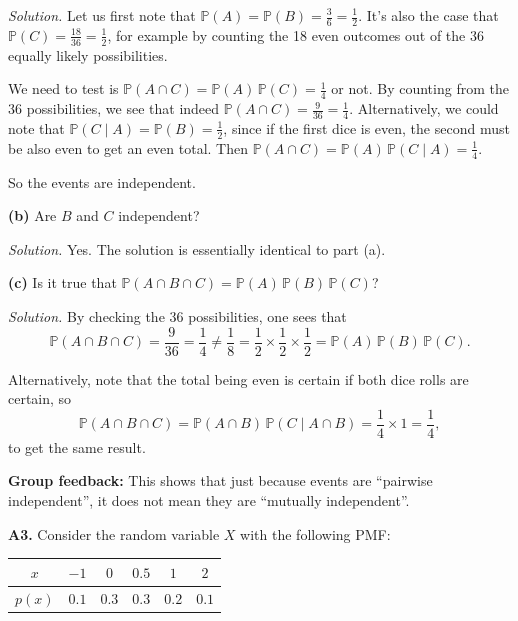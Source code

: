 \documentclass[
  a4paper,
]{book}
\theoremstyle{definition}
\theoremstyle{definition}
\theoremstyle{definition}
\theoremstyle{definition}
\theoremstyle{remark}
\begin{document}
\begin{myanswers}
\emph{Solution.} Let us first note that \(\mathbb P(A) = \mathbb P(B) = \frac36 = \frac12\). It's also the case that \(\mathbb P(C) = \frac{18}{36} = \frac12\), for example by counting the 18 even outcomes out of the 36 equally likely possibilities.

We need to test is \(\mathbb P(A \cap C) = \mathbb P(A) \, \mathbb P(C) = \frac14\) or not. By counting from the 36 possibilities, we see that indeed \(\mathbb P(A \cap C) = \frac{9}{36} = \frac{1}{4}\). Alternatively, we could note that \(\mathbb P(C \mid A) = \mathbb P(B) = \frac12\), since if the first dice is even, the second must be also even to get an even total. Then \(\mathbb P(A \cap C) = \mathbb P(A) \, \mathbb P(C \mid A) = \frac14\).

So the events are independent.

\end{myanswers}

\textbf{(b)} Are \(B\) and \(C\) independent?

\begin{myanswers}
\emph{Solution.} Yes. The solution is essentially identical to part (a).

\end{myanswers}

\textbf{(c)} Is it true that \(\mathbb P(A \cap B \cap C) = \mathbb P(A) \, \mathbb P(B) \, \mathbb P(C)\)?

\begin{myanswers}
\emph{Solution.}
By checking the 36 possibilities, one sees that
\[ \mathbb P(A \cap B \cap C) = \frac{9}{36} = \frac{1}{4} \neq \frac{1}{8} = \frac12 \times \frac12 \times \frac12 = \mathbb P(A)\, \mathbb P(B) \, \mathbb P(C) . \]

Alternatively, note that the total being even is certain if both dice rolls are certain, so
\[ \mathbb P(A \cap B \cap C) = \mathbb P(A \cap B) \, \mathbb P(C \mid A \cap B) = \frac14 \times 1 = \frac14 , \]
to get the same result.

\textbf{Group feedback:} This shows that just because events are ``pairwise independent'', it does not mean they are ``mutually independent''.

\end{myanswers}

\textbf{A3.} Consider the random variable \(X\) with the following PMF:

\begin{longtable}[]{@{}cccccc@{}}
\toprule()
\(x\) & \(-1\) & \(0\) & \(0.5\) & \(1\) & \(2\) \\
\midrule()
\endhead
\(p(x)\) & \(0.1\) & \(0.3\) & \(0.3\) & \(0.2\) & \(0.1\) \\
\bottomrule()
\end{longtable}
\end{document}

